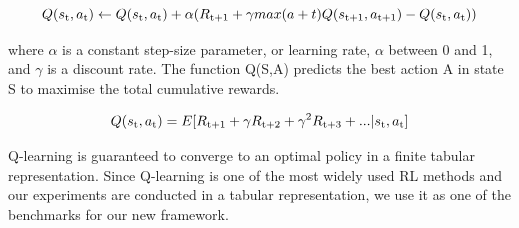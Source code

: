 \documentclass[11pt,twoside]{report}
\theoremstyle{plain}
\theoremstyle{definition}
\begin{document}
\begin{equation}\label{eq:q_learning}
Q(s\textsubscript{t},a\textsubscript{t}) \leftarrow Q(s\textsubscript{t},a\textsubscript{t}) +  \alpha(R\textsubscript{t+1} + \gamma  max (a+t) Q(s\textsubscript{t+1}, a\textsubscript{t+1}) - Q(s\textsubscript{t}, a\textsubscript{t}))
\end{equation}

where $\alpha$ is a constant step-size parameter, or learning rate, $\alpha$ between 0 and 1,  and $\gamma$ is a discount rate. 
The function Q(S,A) predicts the best action A in state S to maximise the total cumulative rewards.




\begin{equation}
Q(s\textsubscript{t},a\textsubscript{t}) = E [R\textsubscript{t+1} + \gamma R\textsubscript{t+2} + \gamma^2 R\textsubscript{t+3} + ... \vert s\textsubscript{t},a\textsubscript{t} ]
\end{equation}

Q-learning is guaranteed to converge to an optimal policy in a finite tabular representation.
Since Q-learning is one of the most widely used RL methods and our experiments are conducted in a tabular representation, we use it as one of the benchmarks for our new framework.


\end{document}
